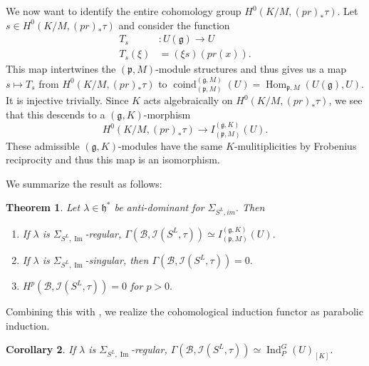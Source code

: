 \documentclass[letterpaper,twosided,11pt]{article}
\theoremstyle{plain}
\newtheorem{theorem}{Theorem}[section]
\newtheorem{corollary}[theorem]{Corollary}
\theoremstyle{definition}
\theoremstyle{remark}
\newcommand{\im}{\operatorname{Im }}
\newcommand{\Hom}{\operatorname{Hom}}
\newcommand{\lie}[1]{\mathfrak{#1}}
\begin{document}
We now want to identify the entire cohomology group $H^0(K/M,(pr)_*\tau).$ 
Let $s\in H^0(K/M, (pr)_*\tau)$ and consider the function
 \begin{align*} T_s&:U(\lie{g})\longrightarrow U \\ T_s(\xi)&=(\xi s)(pr(x)).\end{align*} 
 This map intertwines the $(\lie{p},M)$-module structures and thus gives us a map 
 $s\mapsto T_s$ from $H^0(K/M, (pr)_*\tau)$ to
  $\operatorname{coind}_{(\lie{p},M)}^{(\lie{g},M)}(U)=\Hom_{\lie{p},M}(U(\lie{g}),U).$ 
 It is injective trivially. Since $K$ acts algebraically on $ H^0(K/M, (pr)_*\tau)$, we 
 see that this descends to a $(\lie{g},K)$-morphism \[ H^0(K/M, (pr)_*\tau)\to I_{(\lie{p},M)}^{(\lie{g},K)}(U). \]
 These admissible $(\lie{g},K)$-modules have the same $K$-mulitiplicities
  by Frobenius reciprocity and thus this map is an isomorphism. 
 
 We summarize the result as follows: 
 
 \begin{theorem} 
 	Let $\lambda\in \lie{h}^*$ be anti-dominant for $\Sigma_{S^L,im}.$
	 Then \begin{enumerate} 
		\item If $\lambda$ is $\Sigma_{S^L,\im}$-regular,
		 $\Gamma(\mathcal{B},\mathcal{I}(S^L,\tau))\simeq  I_{(\lie{p},M)}^{(\lie{g},K)}(U).$
		\item If $\lambda$ is $\Sigma_{S^L,\im}$-singular, 
		then $ \Gamma(\mathcal{B},\mathcal{I}(S^L,\tau))=0.$ 
		\item $H^p(\mathcal{B},\mathcal{I}(S^L,\tau))=0$ for $p>0.$ 
	\end{enumerate} 	
 \end{theorem}  

Combining this with \cite[Theorem 11.47]{KnappVogan1995},
 we realize the cohomological induction functor as parabolic induction. 
\begin{corollary} 
	 If $\lambda$ is $\Sigma_{S^L,\im}$-regular, $\Gamma(\mathcal{B},\mathcal{I}(S^L,\tau))\simeq \operatorname{Ind}_P^G(U)_{[K]}.$ 
\end{corollary} 
\end{document}
